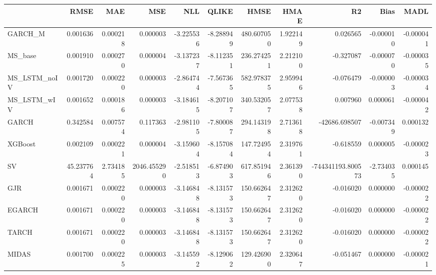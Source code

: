 \begin{tabular}{lrrrrrrrrrr}
\toprule
 & RMSE & MAE & MSE & NLL & QLIKE & HMSE & HMAE & R2 & Bias & MADL \\
\midrule
GARCH_M & 0.001636 & 0.000218 & 0.000003 & -3.225536 & -8.288949 & 480.607050 & 1.922149 & 0.026565 & -0.000010 & -0.000041 \\
MS_base & 0.001910 & 0.000270 & 0.000004 & -3.137237 & -8.112351 & 236.274251 & 2.212100 & -0.327087 & -0.000070 & -0.000035 \\
MS_LSTM_noIV & 0.001720 & 0.000220 & 0.000003 & -2.864744 & -7.567365 & 582.978375 & 2.959946 & -0.076479 & -0.000003 & -0.000034 \\
MS_LSTM_wIV & 0.001652 & 0.000186 & 0.000003 & -3.184615 & -8.207107 & 340.532057 & 2.077538 & 0.007960 & 0.000061 & -0.000042 \\
GARCH & 0.342584 & 0.007574 & 0.117363 & -2.981105 & -7.800087 & 294.143198 & 2.713618 & -42686.698507 & -0.007349 & 0.000132 \\
XGBoost & 0.002109 & 0.000221 & 0.000004 & -3.159604 & -8.157084 & 147.724954 & 2.319761 & -0.618559 & 0.000005 & -0.000023 \\
SV & 45.237764 & 2.734185 & 2046.455290 & -2.518513 & -6.874903 & 617.851946 & 2.361390 & -744341193.800573 & -2.734035 & 0.000145 \\
GJR & 0.001671 & 0.000220 & 0.000003 & -3.146848 & -8.131573 & 150.662647 & 2.312620 & -0.016020 & 0.000000 & -0.000022 \\
EGARCH & 0.001671 & 0.000220 & 0.000003 & -3.146848 & -8.131573 & 150.662647 & 2.312620 & -0.016020 & 0.000000 & -0.000022 \\
TARCH & 0.001671 & 0.000220 & 0.000003 & -3.146848 & -8.131573 & 150.662647 & 2.312620 & -0.016020 & 0.000000 & -0.000022 \\
MIDAS & 0.001700 & 0.000225 & 0.000003 & -3.145592 & -8.129062 & 129.426900 & 2.320647 & -0.051467 & 0.000000 & -0.000021 \\
\bottomrule
\end{tabular}
